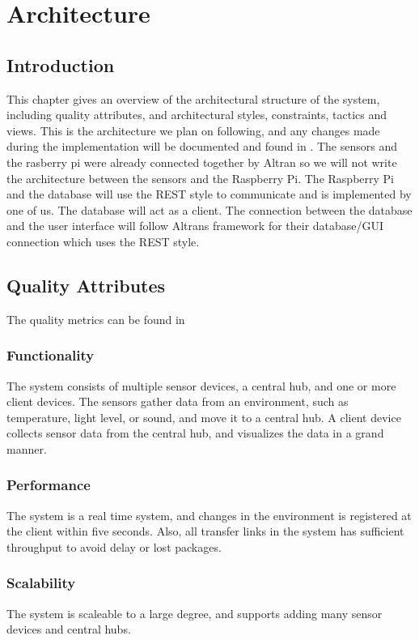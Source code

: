 \documentclass[../document.tex]{subfiles}
\begin{document}
\section{Architecture}
\label{architecture}
\subsection{Introduction}
This chapter gives an overview of the architectural structure of the system, including quality attributes, and architectural styles, constraints, tactics and views. This is the architecture we plan on following, and any changes made during the implementation will be documented and found in . The sensors and the rasberry pi were already connected together by Altran so we will not write the architecture between the sensors and the Raspberry Pi. The Raspberry Pi and the database will use the REST style to communicate and is implemented by one of us. The database will act as a client. The connection between the database and the user interface will follow Altrans framework for their database/GUI connection which uses the REST style.

\subsection{Quality Attributes}
\label{quality_attributes}
The quality metrics can be found in 

\subsubsection{Functionality}
The system consists of multiple sensor devices, a central hub, and one or more client devices. The sensors gather data from an environment, such as temperature, light level, or sound, and move it to a central hub. A client device collects sensor data from the central hub, and visualizes the data in a grand manner.

\subsubsection{Performance}
The system is a real time system, and changes in the environment is registered at the client within five seconds. Also, all transfer links in the system has sufficient throughput to avoid delay or lost packages.

\subsubsection{Scalability}
The system is scaleable to a large degree, and supports adding many sensor devices and central hubs.
\end{document}
